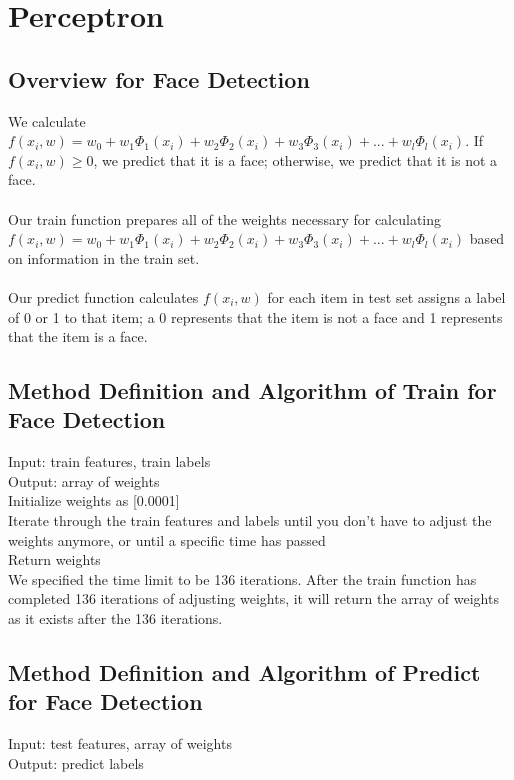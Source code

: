 \documentclass{article}
\begin{document}

\section{Perceptron}

\subsection{Overview for Face Detection}

We calculate $f(x_i , w) = w_0 + w_1\Phi_1(x_i) + w_2 \Phi_2(x_i) + w_3 \Phi_3(x_i) + ...+ w_l\Phi_l(x_i)$. If $f(x_i , w) \geq 0$, we predict that it is a face; otherwise, we predict that it is not a face. \\\\
Our train function prepares all of the weights necessary for calculating $f(x_i , w) = w_0 + w_1\Phi_1(x_i) + w_2 \Phi_2(x_i) + w_3 \Phi_3(x_i) + ...+ w_l\Phi_l(x_i)$ based on information in the train set.\\\\
Our predict function calculates $f(x_i,w)$ for each item in test set assigns a label of 0 or 1 to that item; a 0 represents that the item is not a face and 1 represents that the item is a face.
\subsection{Method Definition and Algorithm of Train for Face Detection}
Input: train features, train labels\\
Output: array of weights\\

Initialize weights as [0.0001]\\
Iterate through the train features and labels until you don’t have to adjust the weights anymore, or until a specific time has passed\\
Return weights\\

We specified the time limit to be 136 iterations. After the train function has completed 136 iterations of adjusting weights, it will return the array of weights as it exists after the 136 iterations.



\subsection{Method Definition and Algorithm of Predict for Face Detection}
Input: test features, array of weights\\
Output: predict labels\\
\end{document}
